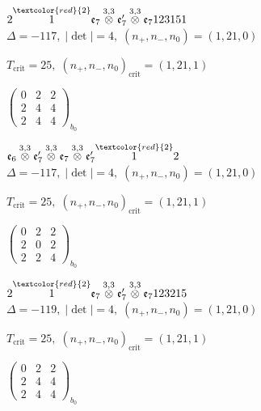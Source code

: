 \documentclass[10pt]{article}
\begin{document}
$2\overset{\textcolor{red}{2}}{1}\mathfrak{e}_7\overset{3,3}{\otimes}\mathfrak{e}_7'\overset{3,3}{\otimes}\mathfrak{e}_7123151$ \quad $\Delta=-117,\; |\det|=4,\; (n_+,n_-,n_0)=(1,21,0)$

\hspace{1em}$T_{\text{crit}}=25,\; (n_+,n_-,n_0)_{\text{crit}}=(1,21,1)$

\hspace{2em}$\left(\begin{smallmatrix}0 & 2 & 2 \\ 2 & 4 & 4 \\ 2 & 4 & 4\end{smallmatrix}\right)_{\!b_0}$

\smallskip

$\mathfrak{e}_6\overset{3,3}{\otimes}\mathfrak{e}_7'\overset{3,3}{\otimes}\mathfrak{e}_7\overset{3,3}{\otimes}\mathfrak{e}_7'\overset{\textcolor{red}{2}}{1}2$ \quad $\Delta=-117,\; |\det|=4,\; (n_+,n_-,n_0)=(1,21,0)$

\hspace{1em}$T_{\text{crit}}=25,\; (n_+,n_-,n_0)_{\text{crit}}=(1,21,1)$

\hspace{2em}$\left(\begin{smallmatrix}0 & 2 & 2 \\ 2 & 0 & 2 \\ 2 & 2 & 4\end{smallmatrix}\right)_{\!b_0}$

\smallskip

$2\overset{\textcolor{red}{2}}{1}\mathfrak{e}_7\overset{3,3}{\otimes}\mathfrak{e}_7'\overset{3,3}{\otimes}\mathfrak{e}_7123215$ \quad $\Delta=-119,\; |\det|=4,\; (n_+,n_-,n_0)=(1,21,0)$

\hspace{1em}$T_{\text{crit}}=25,\; (n_+,n_-,n_0)_{\text{crit}}=(1,21,1)$

\hspace{2em}$\left(\begin{smallmatrix}0 & 2 & 2 \\ 2 & 4 & 4 \\ 2 & 4 & 4\end{smallmatrix}\right)_{\!b_0}$
\end{document}
